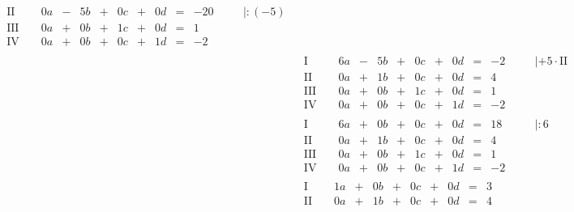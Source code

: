 \begin{exercise}
\begin{minipage}[t]{0.49\linewidth}
\begin{align*}
\begin{array}{r|rrrrrrrrrrrl}
         \text{II}{\,} & {\,} & \num{0}a & - & \num{5}b & + & \num{0}c & + & \num{0}d & = & -\num{20} & {\quad} & |:\left(-\num{5}\right) \\
        \text{III}{\,} & {\,} & \num{0}a & + & \num{0}b & + & \num{1}c & + & \num{0}d & = &   \num{1} & {\quad} &                         \\
         \text{IV}{\,} & {\,} & \num{0}a & + & \num{0}b & + & \num{0}c & + & \num{1}d & = &  -\num{2} & {\quad} &
        \end{array}
        \\[1ex]&
        \begin{array}{r|rrrrrrrrrrrl}
          \text{I}{\,} & {\,} & \num{6}a & - & \num{5}b & + & \num{0}c & + & \num{0}d & = & -\num{2} & {\quad} & |+\num{5}\cdot\text{II} \\
         \text{II}{\,} & {\,} & \num{0}a & + & \num{1}b & + & \num{0}c & + & \num{0}d & = &  \num{4} & {\quad} &                         \\
        \text{III}{\,} & {\,} & \num{0}a & + & \num{0}b & + & \num{1}c & + & \num{0}d & = &  \num{1} & {\quad} &                         \\
         \text{IV}{\,} & {\,} & \num{0}a & + & \num{0}b & + & \num{0}c & + & \num{1}d & = & -\num{2} & {\quad} &
        \end{array}
        \\[1ex]&
        \begin{array}{r|rrrrrrrrrrrl}
          \text{I}{\,} & {\,} & \num{6}a & + & \num{0}b & + & \num{0}c & + & \num{0}d & = & \num{18} & {\quad} & |:\num{6} \\
         \text{II}{\,} & {\,} & \num{0}a & + & \num{1}b & + & \num{0}c & + & \num{0}d & = &  \num{4} & {\quad} &           \\
        \text{III}{\,} & {\,} & \num{0}a & + & \num{0}b & + & \num{1}c & + & \num{0}d & = &  \num{1} & {\quad} &           \\
         \text{IV}{\,} & {\,} & \num{0}a & + & \num{0}b & + & \num{0}c & + & \num{1}d & = & -\num{2} & {\quad} &
        \end{array}
        \\[1ex]&
        \begin{array}{r|rrrrrrrrrrrl}
          \text{I}{\,} & {\,} & \num{1}a & + & \num{0}b & + & \num{0}c & + & \num{0}d & = &  \num{3} & {\quad} &   \\
         \text{II}{\,} & {\,} & \num{0}a & + & \num{1}b & + & \num{0}c & + & \num{0}d & = &  \num{4} & {\quad} &   \\

\end{array}
\end{align*}
\end{minipage}
\end{exercise}
